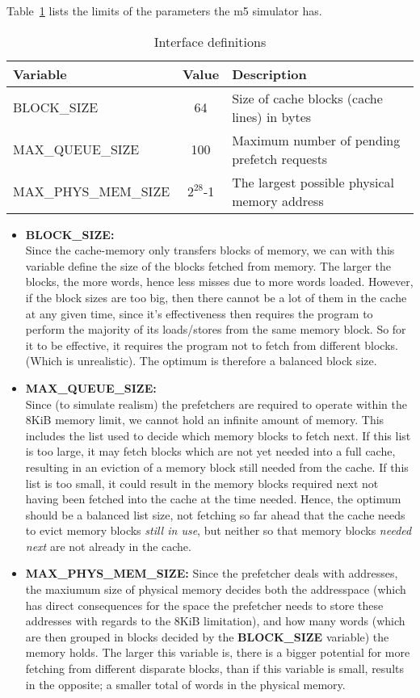 Table~\ref{tab:prefetch-consts} lists the limits of the parameters the m5
simulator has.
\begin{table}[h]
	\caption{Interface definitions}
	\begin{tabularx}{\linewidth}{|X|c|X|}
	\hline
	Variable & Value & Description \\
	\hline
	BLOCK\_SIZE & 64 & Size of cache blocks (cache lines) in bytes \\
	\hline
	MAX\_QUEUE\_SIZE & 100 & Maximum number of pending prefetch requests \\
	\hline
	MAX\_PHYS\_MEM\_SIZE & $2^{28}$-1 & The largest possible physical memory address \\
	\hline
	\end{tabularx}
	\label{tab:prefetch-consts}
\end{table}

\begin{itemize}
	\item \textbf{BLOCK\_SIZE:} \\
		Since the cache-memory only transfers blocks of memory, we can with this
		variable define the size of the blocks fetched from memory. The larger
		the blocks, the more words, hence less misses due to more words loaded.
		However, if the block sizes are too big, then there cannot be a lot of
		them in the cache at any given time, since it's effectiveness then
		requires the program to perform the majority of its loads/stores from
		the same memory block. So for it to be effective, it requires the
		program not to fetch from different blocks. (Which is unrealistic). The
		optimum is therefore a balanced block size.
	\item \textbf{MAX\_QUEUE\_SIZE:} \\
		Since (to simulate realism) the prefetchers are required to operate
		within the 8KiB memory limit, we cannot hold an infinite amount of
		memory. This includes the list used to decide which memory blocks to
		fetch next. If this list is too large, it may fetch blocks which are not
		yet needed into a full cache, resulting in an eviction of a memory block
		still needed from the cache. If this list is too small, it could result
		in the memory blocks required next not having been fetched into the
		cache at the time needed. Hence, the optimum should be a balanced list
		size, not fetching so far ahead that the cache needs to evict memory
		blocks \textit{still in use}, but neither so that memory blocks
		\textit{needed next} are not already in the cache.
	\item \textbf{MAX\_PHYS\_MEM\_SIZE:}
		Since the prefetcher deals with addresses, the maxiumum size of physical
		memory decides both the addresspace (which has direct consequences for
		the space the prefetcher needs to store these addresses with regards to
		the 8KiB limitation), and how many words (which are then grouped in
		blocks decided by the \textbf{BLOCK\_SIZE} variable) the memory holds.
		The larger this variable is, there is a bigger potential for more
		fetching from different disparate blocks, than if this variable is
		small, results in the opposite; a smaller total of words in the physical
		memory.
\end{itemize}

